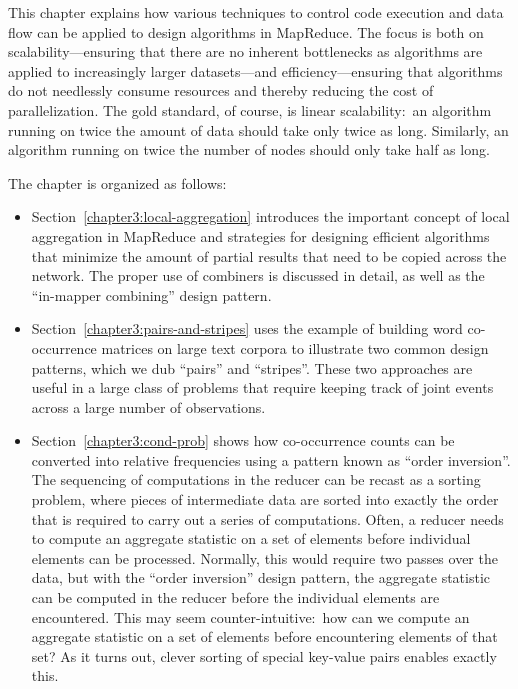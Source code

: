 \documentclass[11pt]{article}
\begin{document}
This chapter explains how various techniques to control code execution
and data flow can be applied to design algorithms in MapReduce.  The
focus is both on scalability---ensuring that there are no inherent
bottlenecks as algorithms are applied to increasingly larger
datasets---and efficiency---ensuring that algorithms do not needlessly
consume resources and thereby reducing the cost of parallelization.
The gold standard, of course, is linear scalability:\ an algorithm
running on twice the amount of data should take only twice as long.
Similarly, an algorithm running on twice the number of nodes should
only take half as long.  

The chapter is organized as follows:

\begin{itemize}

\item Section~\ref{chapter3:local-aggregation} introduces the
  important concept of local aggregation in MapReduce and strategies
  for designing efficient algorithms that minimize the amount of
  partial results that need to be copied across the network.  The
  proper use of combiners is discussed in detail, as well as the
  ``in-mapper combining'' design pattern.

\item Section~\ref{chapter3:pairs-and-stripes} uses the example of
  building word co-occurrence matrices on large text corpora to
  illustrate two common design patterns, which we dub ``pairs'' and
  ``stripes''.  These two approaches are useful in a large class of
  problems that require keeping track of joint events across a large
  number of observations.

\item Section~\ref{chapter3:cond-prob} shows how co-occurrence counts
  can be converted into relative frequencies using a pattern known as
  ``order inversion''.  The sequencing of computations in the reducer
  can be recast as a sorting problem, where pieces of intermediate
  data are sorted into exactly the order that is required to carry out
  a series of computations.  Often, a reducer needs to compute an
  aggregate statistic on a set of elements before individual elements
  can be processed.  Normally, this would require two passes over the
  data, but with the ``order inversion'' design pattern, the aggregate
  statistic can be computed in the reducer before the individual
  elements are encountered.  This may seem counter-intuitive:\ how can
  we compute an aggregate statistic on a set of elements before
  encountering elements of that set?  As it turns out, clever sorting
  of special key-value pairs enables exactly this.


\end{itemize}
\end{document}
